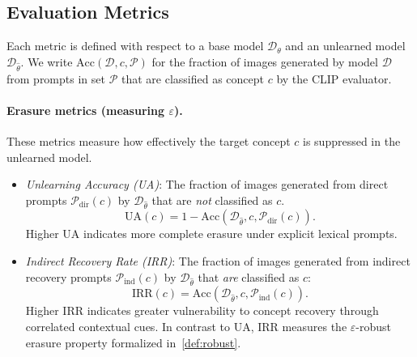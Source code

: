 \subsection{Evaluation Metrics}
\label{app:metric_defs}
Each metric is defined with respect to a base model 
$\mathcal{D}_\theta$ and an unlearned model 
$\mathcal{D}_{\hat\theta}$. We write $\mathrm{Acc}(\mathcal{D}, c, \mathcal{P})$ for the fraction of images generated by model $\mathcal{D}$ from prompts in set $\mathcal{P}$ that are classified as concept $c$ by the CLIP evaluator.

\paragraph{Erasure metrics (measuring $\varepsilon$).}
These metrics measure how effectively the target concept $c$ is suppressed in the unlearned model.
\begin{itemize}
    \item \emph{Unlearning Accuracy (UA)}: The fraction of images generated from direct prompts $\mathcal{P}_{\mathrm{dir}}(c)$ by $\mathcal{D}_{\hat\theta}$ that 
    are \emph{not} classified as $c$. 
    \begin{equation}
    \label{eq:ua}
    \mathrm{UA}(c) = 1 - \mathrm{Acc}(\mathcal{D}_{\hat\theta}, c, \mathcal{P}_{\mathrm{dir}}(c)).
    \end{equation}
    Higher UA indicates more complete erasure under explicit lexical prompts.
    \item \emph{Indirect Recovery Rate (IRR)}: The fraction of images generated from indirect recovery prompts $\mathcal{P}_{\mathrm{ind}}(c)$ by 
    $\mathcal{D}_{\hat\theta}$ that \emph{are} classified as $c$: 
    \begin{equation}
    \label{eq:irr}
    \mathrm{IRR}(c) = \mathrm{Acc}(\mathcal{D}_{\hat\theta}, c, \mathcal{P}_{\mathrm{ind}}(c)).
    \end{equation}
    Higher IRR indicates greater vulnerability to concept recovery through correlated contextual cues. In contrast to UA, IRR measures the $\varepsilon$-robust erasure property formalized in~\cref{def:robust}.
\end{itemize}

